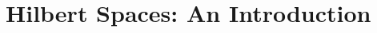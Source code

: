 \documentclass[../../main.tex]{subfiles}
\begin{document}
\chapter{Hilbert Spaces: An Introduction}
\end{document}
